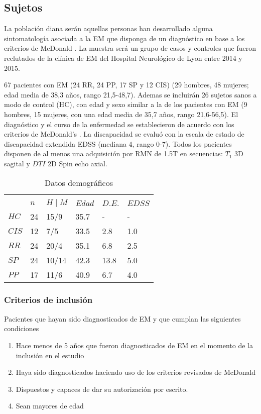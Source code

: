 \documentclass[fleqn,12pt]{UICArticle} %
\begin{document}
\subsection{Sujetos}
La población diana serán aquellas personas han desarrollado alguna sintomatología asociada a la EM que disponga de un diagnóstico en base a los criterios de McDonald \cite{Polman2011}. La muestra será un grupo de casos y controles que fueron reclutados de la clínica de EM del Hospital Neurológico de Lyon entre 2014 y 2015.

67 pacientes con EM (24 RR, 24 PP, 17 SP y 12 CIS) (29 hombres, 48 mujeres; edad media de 38,3 años, rango 21,5-48,7). Ademas se incluirán 26 sujetos sanos a modo de control (HC), con edad y sexo similar a la de los pacientes con EM (9 hombres, 15 mujeres, con una edad media de 35,7 años, rango 21,6-56,5). El diagnóstico y el curso de la enfermedad se establecieron de acuerdo con los criterios de McDonald's \cite{Polman2011}. La discapacidad se evaluó con la escala de estado de discapacidad extendida EDSS (mediana 4, rango 0-7). Todos los pacientes disponen de al menos una adquisición por RMN de 1.5T en secuencias: $T_1$ 3D sagital y $DTI$ 2D Spin echo axial.

\begin{table}[hbt]
\caption{Datos demográficos}
\centering
\begin{tabular}{llllll}
\toprule
\multicolumn{6}{l}{} \\
     & $n$   & $H \mid M$    & $Edad$  & $D.E.$  & $EDSS$  \\
$HC$   & 24  & 15/9   & 35.7  & -     & -     \\
$CIS$  & 12  & 7/5    & 33.5  & 2.8   & 1.0   \\
$RR$   & 24  & 20/4   & 35.1  & 6.8   & 2.5   \\
$SP$   & 24  & 10/14  & 42.3  & 13.8  & 5.0   \\
$PP$   & 17  & 11/6   & 40.9  & 6.7   & 4.0   \\
\bottomrule
\end{tabular}
\label{tab:demographics}
\end{table}

\subsubsection{Criterios de inclusión}
Pacientes que hayan sido diagnosticados de EM y que cumplan las siguientes condiciones
\begin{enumerate}[noitemsep]
\item Hace menos de 5 años que fueron diagnosticados de EM en el momento de la inclusión en el estudio
\item Haya sido diagnosticados haciendo uso de los criterios revisados de McDonald \cite{Polman20112}
\item Dispuestos y capaces de dar su autorización por escrito.
\item Sean mayores de edad
\end{enumerate}
\end{document}
